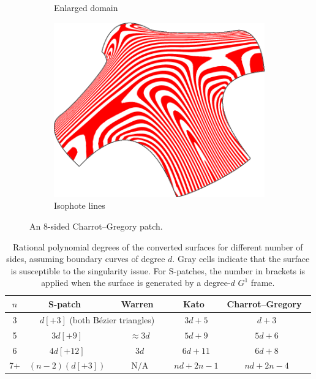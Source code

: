 \documentclass[9pt,academicons]{article}
\begin{document}
\begin{figure}
\begin{subfigure}{.3\textwidth}
    \caption{Enlarged domain}
    \label{fig:8sided-enlarged}
  \end{subfigure}
  \hfill
  \begin{subfigure}{.3\textwidth}
    \centering
    \includegraphics[width=.883\textwidth]{images/8sided-3.png}
    \caption{Isophote lines}
    \label{fig:8sided-iso}
  \end{subfigure}
  \caption{An 8-sided Charrot--Gregory patch.}
  \label{fig:8sided}
\end{figure}

\begin{table}
  \centering
  \begin{tabular}{c|c|c|c|c}
    $n$ & S-patch~\cite{Loop:1989} & Warren~\cite{Warren:1992} & Kato~\cite{Kato:1991} & Charrot--Gregory~\cite{Charrot:1984} \\ \hline
    3 & \multicolumn{2}{c|}{$d[+3]$ (both B\'ezier triangles)} & \cellcolor{light-gray}$3d+5$ & $d+3$ \\ \hline
    5 & \cellcolor{light-light-gray}$3d[+9]$ & $\approx 3d$ & \cellcolor{light-gray}$5d+9$ & $5d+6$ \\ \hline
    6 & \cellcolor{light-light-gray}$4d[+12]$ & $3d$ & \cellcolor{light-gray}$6d+11$ & $6d+8$ \\ \hline
    7+ & \cellcolor{light-gray}$(n-2)(d[+3])$ & $\qquad$N/A$\qquad$ & \cellcolor{light-gray}$nd+2n-1$ & \cellcolor{light-gray}$nd+2n-4$ \\ \hline
  \end{tabular}
  \caption{Rational polynomial degrees of the converted surfaces for different number of sides,
    assuming boundary curves of degree $d$. Gray cells indicate that the surface is susceptible to
    the singularity issue.
    For S-patches, the number in brackets is applied
    when the surface is generated by a degree-$d$ $G^1$ frame.}
  \label{tab:degrees}
\end{table}
\end{document}
